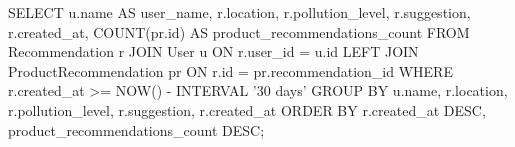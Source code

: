 SELECT 
    u.name AS user_name,
    r.location,
    r.pollution_level,
    r.suggestion,
    r.created_at,
    COUNT(pr.id) AS product_recommendations_count
FROM Recommendation r
JOIN User u ON r.user_id = u.id
LEFT JOIN ProductRecommendation pr ON r.id = pr.recommendation_id
WHERE r.created_at >= NOW() - INTERVAL '30 days'
GROUP BY u.name, r.location, r.pollution_level, r.suggestion, r.created_at
ORDER BY r.created_at DESC, product_recommendations_count DESC;